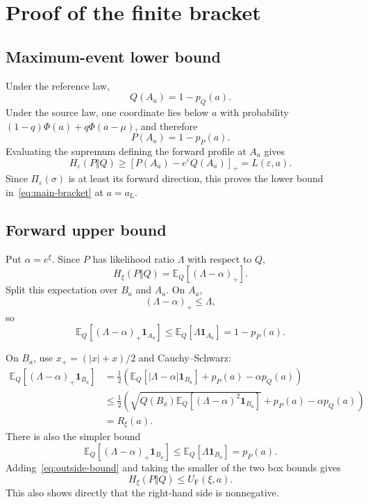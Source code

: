 \documentclass[11pt]{article}
\theoremstyle{remark}
\newcommand{\E}{\mathbb E}
\newcommand{\pos}[1]{\left[#1\right]_{+}}
\begin{document}
\section{Proof of the finite bracket}

\subsection{Maximum-event lower bound}

Under the reference law,
\[
  Q(A_a)=1-p_Q(a).
\]
Under the source law, one coordinate lies below $a$ with probability
$(1-q)\Phi(a)+q\Phi(a-\mu)$, and therefore
\[
  P(A_a)=1-p_P(a).
\]
Evaluating the supremum defining the forward profile at $A_a$ gives
\[
  H_\varepsilon(P\Vert Q)
  \geq
  \pos{P(A_a)-e^\varepsilon Q(A_a)}
  =L(\varepsilon,a).
\]
Since $\Pi_\varepsilon(\sigma)$ is at least its forward direction, this proves the lower
bound in~\eqref{eq:main-bracket} at $a=a_{\mathrm L}$.

\subsection{Forward upper bound}

Put $\alpha=e^\xi$.  Since $P$ has likelihood ratio $\Lambda$ with respect
to $Q$,
\[
  H_\xi(P\Vert Q)=\E_Q[(\Lambda-\alpha)_+].
\]
Split this expectation over $B_a$ and $A_a$.  On $A_a$,
\[
  (\Lambda-\alpha)_+\leq\Lambda,
\]
so
\begin{equation}\label{eq:outside-bound}
  \E_Q[(\Lambda-\alpha)_+\mathbf 1_{A_a}]
  \leq \E_Q[\Lambda\mathbf 1_{A_a}]
  =1-p_P(a).
\end{equation}

On $B_a$, use $x_+=(|x|+x)/2$ and Cauchy--Schwarz:
\begin{align*}
  \E_Q[(\Lambda-\alpha)_+\mathbf 1_{B_a}]
  &=\frac12\left(
      \E_Q[|\Lambda-\alpha|\mathbf 1_{B_a}]
      +p_P(a)-\alpha p_Q(a)
    \right)\\
  &\leq\frac12\left(
      \sqrt{Q(B_a)\E_Q[(\Lambda-\alpha)^2\mathbf 1_{B_a}]}
      +p_P(a)-\alpha p_Q(a)
    \right)\\
  &=R_\xi(a).
\end{align*}
There is also the simpler bound
\[
  \E_Q[(\Lambda-\alpha)_+\mathbf 1_{B_a}]
  \leq\E_Q[\Lambda\mathbf 1_{B_a}]=p_P(a).
\]
Adding~\eqref{eq:outside-bound} and taking the smaller of the two box bounds
gives
\begin{equation}\label{eq:forward-result}
  H_\xi(P\Vert Q)\leq U_{\mathrm F}(\xi,a).
\end{equation}
This also shows directly that the right-hand side is nonnegative.
\end{document}
